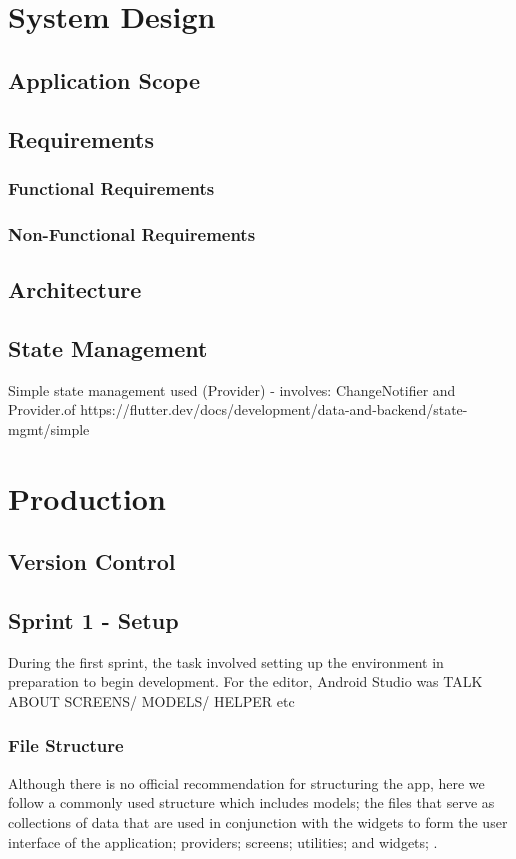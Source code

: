 \documentclass[12pt]{article}
\begin{document}
	\section{System Design}
	\subsection{Application Scope}
	\subsection{Requirements}
	\subsubsection{Functional Requirements}
	\subsubsection{Non-Functional Requirements}
	\subsection{Architecture}
	\subsection{State Management}
	Simple state management used (Provider) -
	involves: ChangeNotifier and Provider.of
	https://flutter.dev/docs/development/data-and-backend/state-mgmt/simple
	
	\section{Production}
	\subsection{Version Control}
	
	
	\subsection{Sprint 1 - Setup}
	During the first sprint, the task involved setting up the environment in preparation to begin development. For the editor, Android Studio was 
	TALK ABOUT SCREENS/ MODELS/ HELPER etc
	\subsubsection{File Structure}
	Although there is no official recommendation for structuring the app, here we follow a commonly used structure which includes models; the files that serve as collections of data that are used in conjunction with the widgets to form the user interface of the application; providers; screens; utilities; and widgets; .
	
\end{document}
